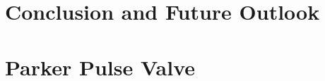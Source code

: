 \documentclass [PhD,nolistoftables,scheader] {uclathes}
\begin{document}
\chapter{} \label{sec: [HCO]}

	

\chapter{Conclusion and Future Outlook}


\appendix

\chapter{Parker Pulse Valve}

\end{document}
